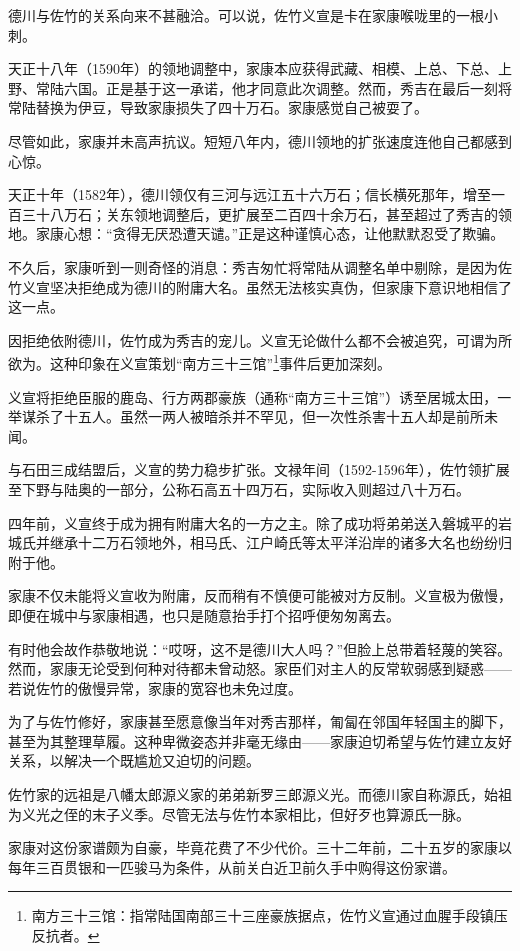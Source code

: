 \documentclass[
]{article}
\begin{document}
德川与佐竹的关系向来不甚融洽。可以说，佐竹义宣是卡在家康喉咙里的一根小刺。

天正十八年（1590年）的领地调整中，家康本应获得武藏、相模、上总、下总、上野、常陆六国。正是基于这一承诺，他才同意此次调整。然而，秀吉在最后一刻将常陆替换为伊豆，导致家康损失了四十万石。家康感觉自己被耍了。

尽管如此，家康并未高声抗议。短短八年内，德川领地的扩张速度连他自己都感到心惊。

天正十年（1582年），德川领仅有三河与远江五十六万石；信长横死那年，增至一百三十八万石；关东领地调整后，更扩展至二百四十余万石，甚至超过了秀吉的领地。家康心想：``贪得无厌恐遭天谴。''正是这种谨慎心态，让他默默忍受了欺骗。

不久后，家康听到一则奇怪的消息：秀吉匆忙将常陆从调整名单中剔除，是因为佐竹义宣坚决拒绝成为德川的附庸大名。虽然无法核实真伪，但家康下意识地相信了这一点。

因拒绝依附德川，佐竹成为秀吉的宠儿。义宣无论做什么都不会被追究，可谓为所欲为。这种印象在义宣策划``南方三十三馆''\footnote{南方三十三馆：指常陆国南部三十三座豪族据点，佐竹义宣通过血腥手段镇压反抗者。}事件后更加深刻。

义宣将拒绝臣服的鹿岛、行方两郡豪族（通称``南方三十三馆''）诱至居城太田，一举谋杀了十五人。虽然一两人被暗杀并不罕见，但一次性杀害十五人却是前所未闻。

与石田三成结盟后，义宣的势力稳步扩张。文禄年间（1592-1596年），佐竹领扩展至下野与陆奥的一部分，公称石高五十四万石，实际收入则超过八十万石。

四年前，义宣终于成为拥有附庸大名的一方之主。除了成功将弟弟送入磐城平的岩城氏并继承十二万石领地外，相马氏、江户崎氏等太平洋沿岸的诸多大名也纷纷归附于他。

家康不仅未能将义宣收为附庸，反而稍有不慎便可能被对方反制。义宣极为傲慢，即便在城中与家康相遇，也只是随意抬手打个招呼便匆匆离去。

有时他会故作恭敬地说：``哎呀，这不是德川大人吗？''但脸上总带着轻蔑的笑容。然而，家康无论受到何种对待都未曾动怒。家臣们对主人的反常软弱感到疑惑------若说佐竹的傲慢异常，家康的宽容也未免过度。

为了与佐竹修好，家康甚至愿意像当年对秀吉那样，匍匐在邻国年轻国主的脚下，甚至为其整理草履。这种卑微姿态并非毫无缘由------家康迫切希望与佐竹建立友好关系，以解决一个既尴尬又迫切的问题。

佐竹家的远祖是八幡太郎源义家的弟弟新罗三郎源义光。而德川家自称源氏，始祖为义光之侄的末子义季。尽管无法与佐竹本家相比，但好歹也算源氏一脉。

家康对这份家谱颇为自豪，毕竟花费了不少代价。三十二年前，二十五岁的家康以每年三百贯银和一匹骏马为条件，从前关白近卫前久手中购得这份家谱。
\end{document}
